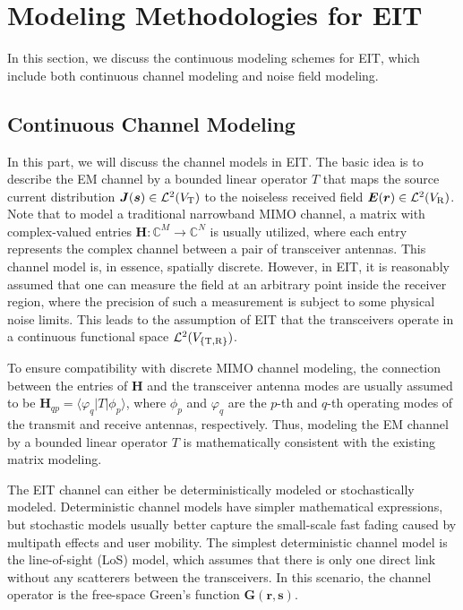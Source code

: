 \documentclass[journal,twocolumn]{IEEEtran}
\begin{document}
\section{Modeling Methodologies for EIT}
In this section, we discuss the continuous modeling schemes for EIT, which include both continuous channel modeling and noise field modeling. 

\vspace{-1em}
\subsection{Continuous Channel Modeling}
In this part, we will discuss the channel models in EIT. The basic idea is to describe the EM channel by a bounded linear operator $T$ that maps the source current distribution ${\bm J}({\bm s})\in\mathcal{L}^2(V_{\rm T})$ to the noiseless received field ${\bm E}({\bm r})\in\mathcal{L}^2(V_{\rm R})$.  
Note that to model a traditional narrowband MIMO channel, a matrix with complex-valued entries ${\bm H}:\mathbb{C}^M\to\mathbb{C}^N$ is usually utilized, where each entry represents the complex channel between a pair of transceiver antennas. 
This channel model is, in essence, spatially discrete. 
However, in EIT, it is reasonably assumed that one can measure the field at an arbitrary point inside the receiver region, where the precision of such a measurement is subject to some physical noise limits. This leads to the assumption of EIT that the transceivers operate in a continuous functional space $\mathcal{L}^2(V_{\{{\rm T, R}\}})$.  

To ensure compatibility with discrete MIMO channel modeling, the connection between the entries of ${\bm H}$ and the transceiver antenna modes are usually assumed to be ${\bm H}_{qp}=\langle\varphi_q|T|\phi_p \rangle$, where $\phi_p$ and $\varphi_q$ are the $p$-th and $q$-th operating modes of the transmit and receive antennas, respectively. Thus, modeling the EM channel by a bounded linear operator $T$ is mathematically consistent with the existing matrix modeling. 

The EIT channel can either be deterministically modeled or stochastically modeled. Deterministic channel models have simpler mathematical expressions, but stochastic models usually better capture the small-scale fast fading caused by multipath effects and user mobility. 
The simplest deterministic channel model is the line-of-sight (LoS) model, which assumes that there is only one direct link without any scatterers between the transceivers. In this scenario, the channel operator is the free-space Green's function ${\bm G}({\bm r}, {\bm s})$. 
\end{document}
